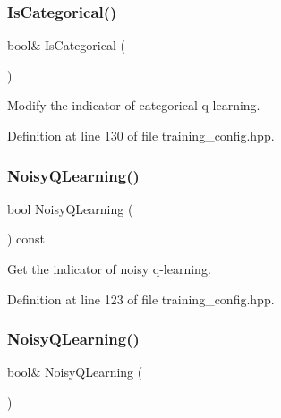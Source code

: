 \subsubsection{Is\+Categorical()\hspace{0.1cm}{\footnotesize\ttfamily [2/2]}}
{\footnotesize\ttfamily bool\& Is\+Categorical (\begin{DoxyParamCaption}{ }\end{DoxyParamCaption})\hspace{0.3cm}{\ttfamily [inline]}}



Modify the indicator of categorical q-\/learning. 



Definition at line 130 of file training\+\_\+config.\+hpp.

\mbox{\label{classmlpack_1_1rl_1_1TrainingConfig_a8c43f11833475085127daec3c393e4b0}} 
\subsubsection{Noisy\+Q\+Learning()\hspace{0.1cm}{\footnotesize\ttfamily [1/2]}}
{\footnotesize\ttfamily bool Noisy\+Q\+Learning (\begin{DoxyParamCaption}{ }\end{DoxyParamCaption}) const\hspace{0.3cm}{\ttfamily [inline]}}



Get the indicator of noisy q-\/learning. 



Definition at line 123 of file training\+\_\+config.\+hpp.

\mbox{\label{classmlpack_1_1rl_1_1TrainingConfig_ab6104949740bbfddb9ee9788186269b6}} 
\subsubsection{Noisy\+Q\+Learning()\hspace{0.1cm}{\footnotesize\ttfamily [2/2]}}
{\footnotesize\ttfamily bool\& Noisy\+Q\+Learning (\begin{DoxyParamCaption}{ }\end{DoxyParamCaption})\hspace{0.3cm}{\ttfamily [inline]}}




